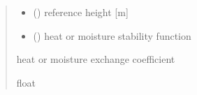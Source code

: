 \documentclass[letterpaper,10pt,english]{sphinxmanual}
\begin{document}
\begin{fulllineitems}
\begin{quote}
\begin{description}
\begin{itemize}
\item {}
\sphinxAtStartPar
{} () \textendash{} reference height                   {[}m{]}

\item {}
\sphinxAtStartPar
{} () \textendash{} heat or moisture stability function

\end{itemize}

\sphinxAtStartPar
{} \textendash{} heat or moisture exchange coefficient

\sphinxAtStartPar
float

\end{description}\end{quote}

\end{fulllineitems}

\end{document}
